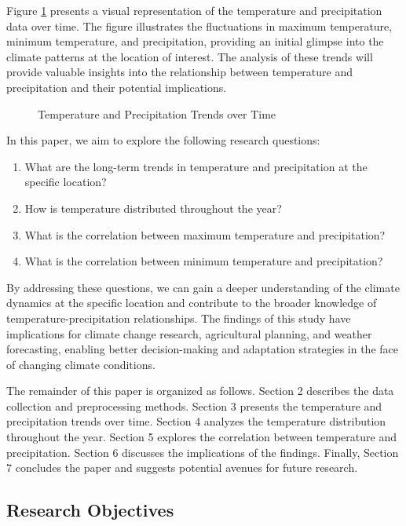 \documentclass{article}
\begin{document}
Figure \ref{fig:temperature_precipitation} presents a visual representation of the temperature and precipitation data over time. The figure illustrates the fluctuations in maximum temperature, minimum temperature, and precipitation, providing an initial glimpse into the climate patterns at the location of interest. The analysis of these trends will provide valuable insights into the relationship between temperature and precipitation and their potential implications.

\begin{figure}[htbp]
  \centering
  \caption{Temperature and Precipitation Trends over Time}
  \label{fig:temperature_precipitation}
\end{figure}

In this paper, we aim to explore the following research questions:

\begin{enumerate}
  \item What are the long-term trends in temperature and precipitation at the specific location?
  \item How is temperature distributed throughout the year?
  \item What is the correlation between maximum temperature and precipitation?
  \item What is the correlation between minimum temperature and precipitation?
\end{enumerate}

By addressing these questions, we can gain a deeper understanding of the climate dynamics at the specific location and contribute to the broader knowledge of temperature-precipitation relationships. The findings of this study have implications for climate change research, agricultural planning, and weather forecasting, enabling better decision-making and adaptation strategies in the face of changing climate conditions.

The remainder of this paper is organized as follows. Section 2 describes the data collection and preprocessing methods. Section 3 presents the temperature and precipitation trends over time. Section 4 analyzes the temperature distribution throughout the year. Section 5 explores the correlation between temperature and precipitation. Section 6 discusses the implications of the findings. Finally, Section 7 concludes the paper and suggests potential avenues for future research.

\subsection{Research Objectives}
\end{document}
